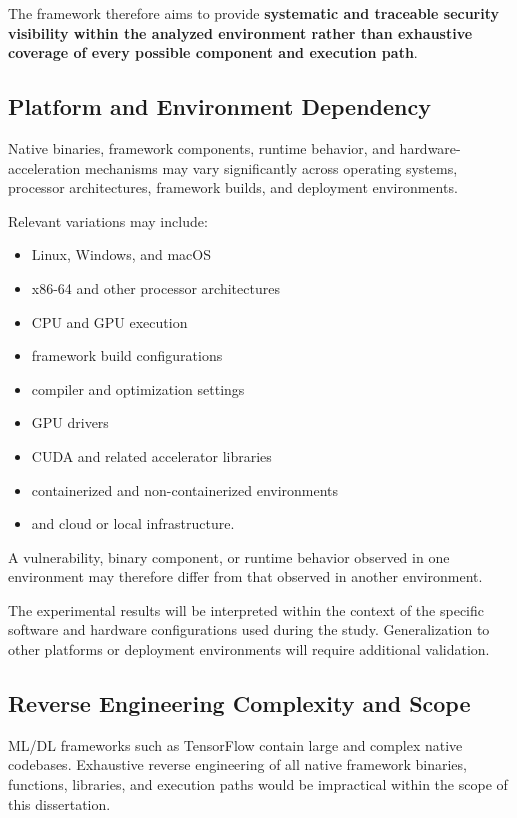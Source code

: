 \documentclass[
  12pt,
  letterpaper,
  oneside]{report}
\providecommand{\tightlist}{%
  \setlength{\itemsep}{0pt}\setlength{\parskip}{0pt}}
\begin{document}
The framework therefore aims to provide \textbf{systematic and traceable
security visibility within the analyzed environment rather than
exhaustive coverage of every possible component and execution path}.

\subsection{Platform and Environment Dependency}\label{1312-platform-and-environment-dependency}

Native binaries, framework components, runtime behavior, and
hardware-acceleration mechanisms may vary significantly across operating
systems, processor architectures, framework builds, and deployment
environments.

Relevant variations may include:

\begin{itemize}
\tightlist
\item
  Linux, Windows, and macOS
\item
  x86-64 and other processor architectures
\item
  CPU and GPU execution
\item
  framework build configurations
\item
  compiler and optimization settings
\item
  GPU drivers
\item
  CUDA and related accelerator libraries
\item
  containerized and non-containerized environments
\item
  and cloud or local infrastructure.
\end{itemize}

A vulnerability, binary component, or runtime behavior observed in one
environment may therefore differ from that observed in another
environment.

The experimental results will be interpreted within the context of the
specific software and hardware configurations used during the study.
Generalization to other platforms or deployment environments will
require additional validation.

\subsection{Reverse Engineering Complexity and Scope}\label{1313-reverse-engineering-complexity-and-scope}

ML/DL frameworks such as TensorFlow contain large and complex native
codebases. Exhaustive reverse engineering of all native framework
binaries, functions, libraries, and execution paths would be impractical
within the scope of this dissertation.
\end{document}
